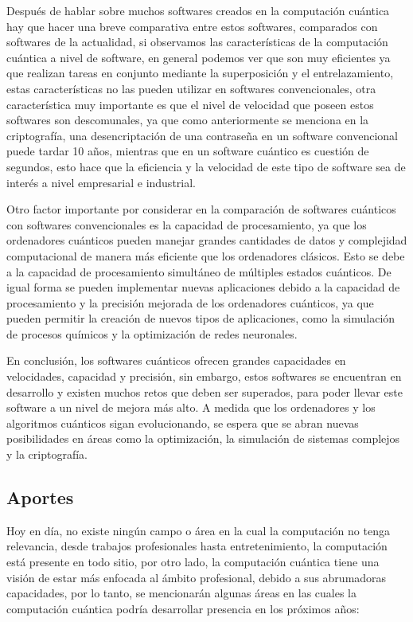 \documentclass[twoside]{article}
\begin{document}
Después de hablar sobre muchos softwares creados en la computación cuántica hay que hacer una breve comparativa entre estos softwares, comparados con softwares de la actualidad, si observamos las características de la computación cuántica a nivel de software, en general podemos ver que son muy eficientes ya que realizan tareas en conjunto mediante la superposición y el entrelazamiento, estas características no las pueden utilizar en softwares convencionales, otra característica muy importante es que el nivel de velocidad que poseen estos softwares son descomunales, ya que como anteriormente se menciona en la criptografía, una desencriptación de una contraseña en un software convencional puede tardar 10 años, mientras que en un software cuántico es cuestión de segundos, esto hace que la eficiencia y la velocidad de este tipo de software sea de interés a nivel empresarial e industrial. 

Otro factor importante por considerar en la comparación de softwares cuánticos con softwares convencionales es la capacidad de procesamiento, ya que los ordenadores cuánticos pueden manejar grandes cantidades de datos y complejidad computacional de manera más eficiente que los ordenadores clásicos. Esto se debe a la capacidad de procesamiento simultáneo de múltiples estados cuánticos. De igual forma se pueden implementar nuevas aplicaciones debido a la capacidad de procesamiento y la precisión mejorada de los ordenadores cuánticos, ya que pueden permitir la creación de nuevos tipos de aplicaciones, como la simulación de procesos químicos y la optimización de redes neuronales. 

En conclusión, los softwares cuánticos ofrecen grandes capacidades en velocidades, capacidad y precisión, sin embargo, estos softwares se encuentran en desarrollo y existen muchos retos que deben ser superados, para poder llevar este software a un nivel de mejora más alto. A medida que los ordenadores y los algoritmos cuánticos sigan evolucionando, se espera que se abran nuevas posibilidades en áreas como la optimización, la simulación de sistemas complejos y la criptografía. 

\subsection{Aportes}
Hoy en día, no existe ningún campo o área en la cual la computación no tenga relevancia, desde trabajos profesionales hasta entretenimiento, la computación está presente en todo sitio, por otro lado, la computación cuántica tiene una visión de estar más enfocada al ámbito profesional, debido a sus abrumadoras capacidades, por lo tanto, se mencionarán algunas áreas en las cuales la computación cuántica podría desarrollar presencia en los próximos años:
\end{document}
